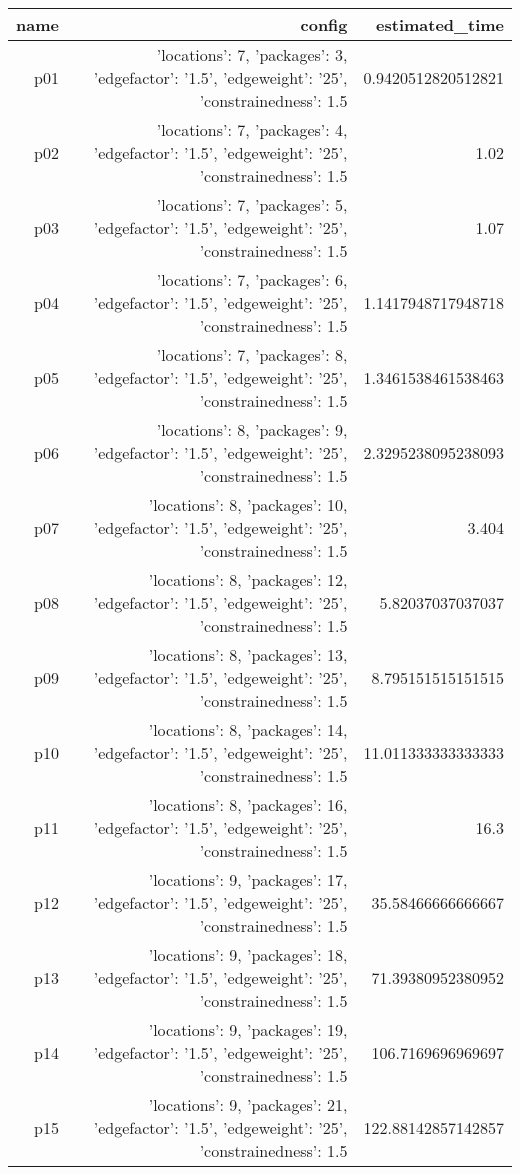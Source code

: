 \documentclass{article}
\begin{document}
                            \begin{center}
                            \scriptsize
                            \begin{tabular}{r|r|r}
                            name & config & estimated\_time\\\midrule
                              p01&{'locations': 7, 'packages': 3, 'edgefactor': '1.5', 'edgeweight': '25', 'constrainedness': 1.5}&0.9420512820512821\\
  p02&{'locations': 7, 'packages': 4, 'edgefactor': '1.5', 'edgeweight': '25', 'constrainedness': 1.5}&1.02\\
  p03&{'locations': 7, 'packages': 5, 'edgefactor': '1.5', 'edgeweight': '25', 'constrainedness': 1.5}&1.07\\
  p04&{'locations': 7, 'packages': 6, 'edgefactor': '1.5', 'edgeweight': '25', 'constrainedness': 1.5}&1.1417948717948718\\
  p05&{'locations': 7, 'packages': 8, 'edgefactor': '1.5', 'edgeweight': '25', 'constrainedness': 1.5}&1.3461538461538463\\
  p06&{'locations': 8, 'packages': 9, 'edgefactor': '1.5', 'edgeweight': '25', 'constrainedness': 1.5}&2.3295238095238093\\
  p07&{'locations': 8, 'packages': 10, 'edgefactor': '1.5', 'edgeweight': '25', 'constrainedness': 1.5}&3.404\\
  p08&{'locations': 8, 'packages': 12, 'edgefactor': '1.5', 'edgeweight': '25', 'constrainedness': 1.5}&5.82037037037037\\
  p09&{'locations': 8, 'packages': 13, 'edgefactor': '1.5', 'edgeweight': '25', 'constrainedness': 1.5}&8.795151515151515\\
  p10&{'locations': 8, 'packages': 14, 'edgefactor': '1.5', 'edgeweight': '25', 'constrainedness': 1.5}&11.011333333333333\\
  p11&{'locations': 8, 'packages': 16, 'edgefactor': '1.5', 'edgeweight': '25', 'constrainedness': 1.5}&16.3\\
  p12&{'locations': 9, 'packages': 17, 'edgefactor': '1.5', 'edgeweight': '25', 'constrainedness': 1.5}&35.58466666666667\\
  p13&{'locations': 9, 'packages': 18, 'edgefactor': '1.5', 'edgeweight': '25', 'constrainedness': 1.5}&71.39380952380952\\
  p14&{'locations': 9, 'packages': 19, 'edgefactor': '1.5', 'edgeweight': '25', 'constrainedness': 1.5}&106.7169696969697\\
  p15&{'locations': 9, 'packages': 21, 'edgefactor': '1.5', 'edgeweight': '25', 'constrainedness': 1.5}&122.88142857142857\\

\end{tabular}
\end{center}
\end{document}
